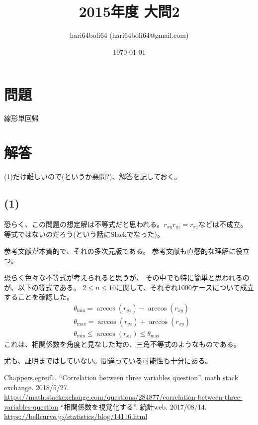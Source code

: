 \documentclass[a4paper, 10pt, dvipdfmx]{jlreq}
\begin{document}
\title{2015年度 大問2}
\author{hari64boli64 (hari64boli64@gmail.com)}
\date{\today}
\maketitle

\section{問題}

線形単回帰

\section{解答}

 (1)だけ難しいので(というか悪問?)、解答を記しておく。

\subsection*{(1)}

恐らく、この問題の想定解は不等式だと思われる。$r_{xy}r_{yz} = r_{xz}$などは不成立。
等式ではないのだろう(という話にSlackでなった)。

参考文献\cite{label:1}が本質的で、それの多次元版である。
参考文献\cite{label:2}も直感的な理解に役立つ。

恐らく色々な不等式が考えられると思うが、
その中でも特に簡単と思われるのが、以下の等式である。
$2\leq n \leq 10$に関して、それぞれ1000ケースについて成立することを確認した。
\begin{align*}
   & \theta_{\text{min}} = \arccos(r_{yz})-\arccos(r_{xy})             \\
   & \theta_{\text{max}} = \arccos(r_{yz})+\arccos(r_{xy})             \\
   & \theta_{\text{min}} \leq \arccos(r_{xz}) \leq \theta_{\text{max}}
\end{align*}
これは、相関係数を角度と見なした時の、三角不等式のようなものである。

尤も、証明まではしていない。間違っている可能性も十分にある。



\begin{thebibliography}{9}
  Chappers,egreif1. ``Correlation between three variables question''. math stack exchange. 2018/5/27.\\\url{https://math.stackexchange.com/questions/284877/correlation-between-three-variables-question}
  ``相関係数を視覚化する''. 統計web. 2017/08/14.\\\url{https://bellcurve.jp/statistics/blog/14116.html}
\end{thebibliography}
\end{document}
